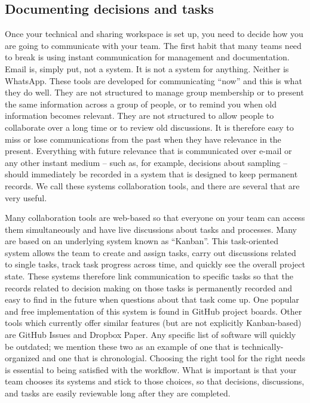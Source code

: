 \subsection{Documenting decisions and tasks}

Once your technical and sharing workspace is set up,
you need to decide how you are going to communicate with your team.
The first habit that many teams need to break
is using instant communication for management and documentation.
Email is, simply put, not a system. It is not a system for anything. Neither is WhatsApp.
These tools are developed for communicating ``now'' and this is what they do well.
They are not structured to manage group membership or to present the same information
across a group of people, or to remind you when old information becomes relevant.
They are not structured to allow people to collaborate over a long time or to review old discussions.
It is therefore easy to miss or lose communications from the past when they have relevance in the present.
Everything with future relevance that is communicated over e-mail or any other instant medium
-- such as, for example, decisions about sampling --
should immediately be recorded in a system that is designed to keep permanent records.
We call these systems collaboration tools, and there are several that are very useful.

Many collaboration tools are web-based
so that everyone on your team can access them simultaneously
and have live discussions about tasks and processes.
Many are based on an underlying system known as ``Kanban''.
This task-oriented system allows the team to create and assign tasks,
carry out discussions related to single tasks,
track task progress across time, and quickly see the overall project state.
These systems therefore link communication to specific tasks so that
the records related to decision making on those tasks is permanently recorded
and easy to find in the future when questions about that task come up.
One popular and free implementation of this system is found in GitHub project boards.
Other tools which currently offer similar features (but are not explicitly Kanban-based)
are GitHub Issues and Dropbox Paper.
Any specific list of software will quickly be outdated;
we mention these two as an example of one that is technically-organized and one that is chronologial.
Choosing the right tool for the right needs is essential to being satisfied with the workflow.
What is important is that your team chooses its systems and stick to those choices,
so that decisions, discussions, and tasks are easily reviewable long after they are completed.

